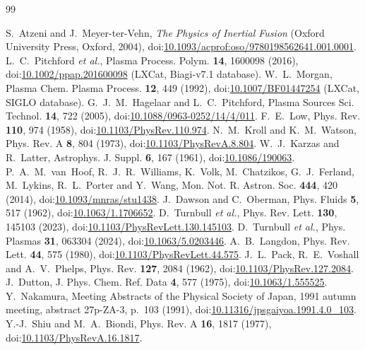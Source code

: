 \documentclass[11pt]{article}
\numberwithin{equation}{section}
\begin{document}
\begin{thebibliography}{99}
\raggedright
{} S.~Atzeni and J.~Meyer-ter-Vehn, \emph{The Physics of Inertial Fusion}
(Oxford University Press, Oxford, 2004), doi:\href{https://doi.org/10.1093/acprof:oso/9780198562641.001.0001}{10.1093/acprof:oso/9780198562641.001.0001}.
 L.~C.~Pitchford \emph{et al.}, Plasma Process. Polym. \textbf{14}, 1600098 (2016),
doi:\href{https://doi.org/10.1002/ppap.201600098}{10.1002/ppap.201600098} (LXCat, Biagi-v7.1 database).
 W.~L.~Morgan, Plasma Chem. Plasma Process. \textbf{12}, 449 (1992),
doi:\href{https://doi.org/10.1007/BF01447254}{10.1007/BF01447254} (LXCat, SIGLO database).
 G.~J.~M.~Hagelaar and L.~C.~Pitchford, Plasma Sources Sci. Technol. \textbf{14}, 722 (2005),
doi:\href{https://doi.org/10.1088/0963-0252/14/4/011}{10.1088/0963-0252/14/4/011}.
 F.~E.~Low, Phys. Rev. \textbf{110}, 974 (1958),
doi:\href{https://doi.org/10.1103/PhysRev.110.974}{10.1103/PhysRev.110.974}.
 N.~M.~Kroll and K.~M.~Watson, Phys. Rev. A \textbf{8}, 804 (1973),
doi:\href{https://doi.org/10.1103/PhysRevA.8.804}{10.1103/PhysRevA.8.804}.
 W.~J.~Karzas and R.~Latter, Astrophys. J. Suppl. \textbf{6}, 167 (1961),
doi:\href{https://doi.org/10.1086/190063}{10.1086/190063}.
 P.~A.~M.~van~Hoof, R.~J.~R.~Williams, K.~Volk, M.~Chatzikos, G.~J.~Ferland, M.~Lykins,
R.~L.~Porter and Y.~Wang, Mon. Not. R. Astron. Soc. \textbf{444}, 420 (2014),
doi:\href{https://doi.org/10.1093/mnras/stu1438}{10.1093/mnras/stu1438}.
 J.~Dawson and C.~Oberman, Phys. Fluids \textbf{5}, 517 (1962),
doi:\href{https://doi.org/10.1063/1.1706652}{10.1063/1.1706652}.
 D.~Turnbull \emph{et al.}, Phys. Rev. Lett. \textbf{130}, 145103 (2023),
doi:\href{https://doi.org/10.1103/PhysRevLett.130.145103}{10.1103/PhysRevLett.130.145103}.
 D.~Turnbull \emph{et al.}, Phys. Plasmas \textbf{31}, 063304 (2024),
doi:\href{https://doi.org/10.1063/5.0203446}{10.1063/5.0203446}.
 A.~B.~Langdon, Phys. Rev. Lett. \textbf{44}, 575 (1980),
doi:\href{https://doi.org/10.1103/PhysRevLett.44.575}{10.1103/PhysRevLett.44.575}.
 J.~L.~Pack, R.~E.~Voshall and A.~V.~Phelps, Phys. Rev. \textbf{127}, 2084 (1962),
doi:\href{https://doi.org/10.1103/PhysRev.127.2084}{10.1103/PhysRev.127.2084}.
 J.~Dutton, J. Phys. Chem. Ref. Data \textbf{4}, 577 (1975),
doi:\href{https://doi.org/10.1063/1.555525}{10.1063/1.555525}.
 Y.~Nakamura, Meeting Abstracts of the Physical Society of Japan, 1991 autumn meeting,
abstract 27p-ZA-3, p.~103 (1991), doi:\href{https://doi.org/10.11316/jpsgaiyoa.1991.4.0_103}{10.11316/jpsgaiyoa.1991.4.0\_103}.
 Y.-J.~Shiu and M.~A.~Biondi, Phys. Rev. A \textbf{16}, 1817 (1977),
doi:\href{https://doi.org/10.1103/PhysRevA.16.1817}{10.1103/PhysRevA.16.1817}.
\end{thebibliography}
\end{document}
